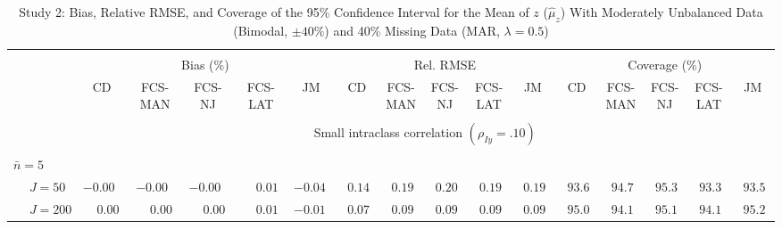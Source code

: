 \begin{sidewaystable}
\begin{threeparttable}
\setlength{\tabcolsep}{1.0pt}
\renewcommand{\arraystretch}{0.95}
\footnotesize
\caption{\small Study 2: Bias, Relative RMSE, and Coverage of the 95\% Confidence Interval for the Mean of $z$ ($\hat\mu_z$) With Moderately Unbalanced Data (Bimodal, $\pm 40\%$) and 40\% Missing Data (MAR, $\lambda=0.5$)}
\begin{tabular}{llccccccccccccccc}
\hline\\[-1.8ex]
& & \multicolumn{5}{c}{Bias (\%)} & \multicolumn{5}{c}{Rel. RMSE} & \multicolumn{5}{c}{Coverage (\%)} \\ \cmidrule(r){3-7}\cmidrule(r){8-12}\cmidrule(r){13-17}
 &  & CD & \makecell{FCS-\\MAN} & \makecell{FCS-\\NJ} & \makecell{FCS-\\LAT} & JM & CD & \makecell{FCS-\\MAN} & \makecell{FCS-\\NJ} & \makecell{FCS-\\LAT} & JM & CD & \makecell{FCS-\\MAN} & \makecell{FCS-\\NJ} & \makecell{FCS-\\LAT} & \multicolumn{1}{c}{JM} \\ 
[0.4ex]\hline\\[-1.8ex]
& & \multicolumn{15}{c}{Small intraclass correlation $(\rho_{Iy}=.10)$} \\[0.6ex]\hline\\[-1.8ex]
\multicolumn{4}{l}{$\bar{n}=5$} \\  & \nopagebreak $\;J=50$  & ${-}0.00\phantom{0}$ & ${-}0.00\phantom{0}$ & ${-}0.00\phantom{0}$ & $\phantom{-}0.01\phantom{0}$ & ${-}0.04\phantom{0}$ & $\phantom{0}0.14\phantom{0}$ & $\phantom{0}0.19\phantom{0}$ & $\phantom{0}0.20\phantom{0}$ & $\phantom{0}0.19\phantom{0}$ & $\phantom{0}0.19\phantom{0}$ & $\phantom{0}93.6\phantom{0}$ & $\phantom{0}94.7\phantom{0}$ & $\phantom{0}95.3\phantom{0}$ & $\phantom{0}93.3\phantom{0}$ & $\phantom{0}93.5\phantom{0}$ \\
 & \nopagebreak $\;J=200$  & $\phantom{-}0.00\phantom{0}$ & $\phantom{-}0.00\phantom{0}$ & $\phantom{-}0.00\phantom{0}$ & $\phantom{-}0.01\phantom{0}$ & ${-}0.01\phantom{0}$ & $\phantom{0}0.07\phantom{0}$ & $\phantom{0}0.09\phantom{0}$ & $\phantom{0}0.09\phantom{0}$ & $\phantom{0}0.09\phantom{0}$ & $\phantom{0}0.09\phantom{0}$ & $\phantom{0}95.0\phantom{0}$ & $\phantom{0}94.1\phantom{0}$ & $\phantom{0}95.1\phantom{0}$ & $\phantom{0}94.1\phantom{0}$ & $\phantom{0}95.2\phantom{0}$ \\

\end{tabular}
\end{threeparttable}
\end{sidewaystable}

